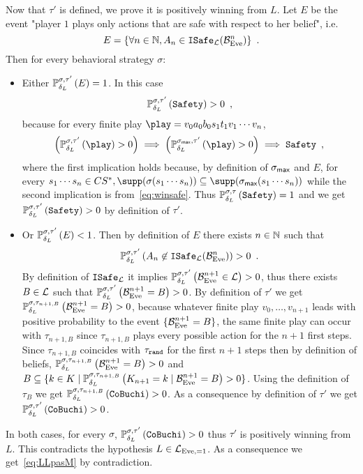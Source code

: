 Now that $\tau'$ is defined, we prove it is positively winning from $L$.
Let $E$ be the event 
{"player $1$ plays only actions that are safe with respect to her belief", i.e.}
\[
E = \{ \forall n\in \mathbb{N}, A_n \in {\tt ISafe}_{\mathcal{L}}(\mathcal{B}_{\text{Eve}}^n)\}\enspace.
\]
Then for every behavioral strategy $\sigma$:
\begin{itemize}
  \item[\textbullet]
Either $\mathbb{P}^{\sigma,\tau'}_{\delta_L}\left({E}\right)=1$. In this case 
\[
\mathbb{P}^{\sigma,\tau'}_{\delta_L}\left({{\tt Safety}}\right)> 0\enspace,
\]
because for every {finite play $\play=v_0a_0b_0s_1t_1v_1\cdots v_n$,}
\[
\left(\probimp{\sigma,\tau'}{\delta_L}{\play} > 0\right)
\implies
\left(\probimp{\sigma_{\can},\tau'}{\delta_L}{\play} > 0\right)
\implies
\winsafe\enspace,
\]
where the first implication holds because, by definition of $\sigma_{\textsf{max}}$ and $E$,
for every $s_1\cdots s_n\in CS^*, \supp(\sigma(s_1\cdots s_n))\subseteq \supp(\sigma_{\can}(s_1\cdots s_n))$
while the second implication is from~\eqref{eq:winsafe}.
Thus $\mathbb{P}^{\sigma,\tau}_{\delta_L}\left({{\tt Safety}}\right)= 1$ and we get
$\mathbb{P}^{\sigma,\tau'}_{\delta_L}\left({{\tt Safety}}\right) > 0$ by definition of
$\tau'$.
\item[\textbullet]
Or $\mathbb{P}^{\sigma,\tau'}_{\delta_L}\left({E}\right)<1$.
Then by definition of $E$ there exists $n\in\mathbb{N}$
such that 
\[
\mathbb{P}^{\sigma,\tau'}_{\delta_L}\left({A_n  \not\in
{\tt ISafe}_{\mathcal{L}}(\mathcal{B}_{\text{Eve}}^n)}\right)>0\enspace.
\]
{
By definition of ${\tt ISafe}_{\mathcal{L}}$ it implies
$\mathbb{P}^{\sigma,\tau'}_{\delta_L}\left({\mathcal{B}_{\text{Eve}}^{n+1}  \in \mathcal{L}}\right)>0$,
thus there exists $B\in \mathcal{L}$ such that
$\mathbb{P}^{\sigma,\tau'}_{\delta_L}\left({\mathcal{B}_{\text{Eve}}^{n+1} =B}\right)>0$.
By definition of $\tau'$ we get
$\mathbb{P}^{\sigma,\tau_{n+1,B}}_{\delta_L}\left({\mathcal{B}_{\text{Eve}}^{n+1} =B}\right)>0$,
because whatever finite play $v_0,\ldots, v_{n+1}$ leads with positive probability to
the event $\{\mathcal{B}_{\text{Eve}}^{n+1} =B\}$,
the same finite play can occur with 
$\tau_{n+1,B}$ since $\tau_{n+1,B}$ plays every possible action for the $n+1$ first steps.
Since $\tau_{n+1,B}$ coincides with $\tau_{\tt rand}$ for the first $n+1$ steps then
by definition of beliefs,
$\mathbb{P}^{\sigma,\tau_{n+1,B}}_{\delta_L}\left({\mathcal{B}_{\text{Eve}}^{n+1} =B}\right)>0$
and $B\subseteq \{ k\in K\mid \mathbb{P}^{\sigma,\tau_{n+1,B}}_{\delta_L}\left({K_{n+1}=k\mid \mathcal{B}_{\text{Eve}}^{n+1} =B}\right)>0\}$.
%
Using the definition of $\tau_B$ we get 
$\mathbb{P}^{\sigma,\tau_{n+1,B}}_{\delta_L}\left({{\tt CoBuchi}}\right)>0$.
}
As a consequence by definition of $\tau'$
we get  $ \mathbb{P}^{\sigma,\tau'}_{\delta_L}\left({{\tt CoBuchi}}\right)
>0 $.
\end{itemize}  
In both cases, for every $\sigma$,
$\mathbb{P}^{\sigma,\tau'}_{\delta_L}\left({{\tt CoBuchi} }\right) >0 $
thus $\tau'$ is positively winning from $L$.
This contradicts the
hypothesis $L\in \mathcal{L}_{\text{Eve},=1}$. As a consequence we get~\eqref{eq:LLpasM} by contradiction.

